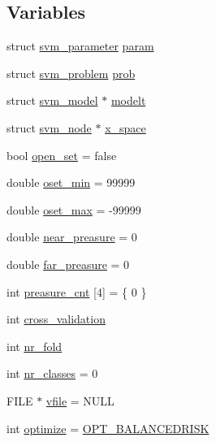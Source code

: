 \subsection*{Variables}
\begin{DoxyCompactItemize}
\item 
struct \hyperlink{structsvm__parameter}{svm\-\_\-parameter} \hyperlink{_2svm-train_8cpp_abef2e39cc4fa6cc6870dddf9afa2cfad}{param}
\item 
struct \hyperlink{structsvm__problem}{svm\-\_\-problem} \hyperlink{_2svm-train_8cpp_a3d3cd08abb1a582bcbb3095eb03ed0d6}{prob}
\item 
struct \hyperlink{structsvm__model}{svm\-\_\-model} $\ast$ \hyperlink{_2svm-train_8cpp_a0b730cfd99e9c8a2ece39a165ebcc5ef}{modelt}
\item 
struct \hyperlink{structsvm__node}{svm\-\_\-node} $\ast$ \hyperlink{_2svm-train_8cpp_aee6e5726660b16e12499d9bfa6eef01f}{x\-\_\-space}
\item 
bool \hyperlink{_2svm-train_8cpp_a17843ee1d8102ef588a3f997e827bc70}{open\-\_\-set} = false
\item 
double \hyperlink{_2svm-train_8cpp_a2bcd8955244b3b5ed1918acc0ce4014e}{oset\-\_\-min} = 99999
\item 
double \hyperlink{_2svm-train_8cpp_a6a83be17519c65392007b1449d5246e9}{oset\-\_\-max} = -\/99999
\item 
double \hyperlink{_2svm-train_8cpp_ab569b65ce2e86831530c897a3ad5c901}{near\-\_\-preasure} = 0
\item 
double \hyperlink{_2svm-train_8cpp_a57ce01656059264c677404c310f3a04e}{far\-\_\-preasure} = 0
\item 
int \hyperlink{_2svm-train_8cpp_aee8f27d5a82f967da296688aee11c230}{preasure\-\_\-cnt} \mbox{[}4\mbox{]} = \{ 0 \}
\item 
int \hyperlink{_2svm-train_8cpp_a3ed295b75b08a20ed2bbed4a67f8d18a}{cross\-\_\-validation}
\item 
int \hyperlink{_2svm-train_8cpp_a8e8ea59d1060e411ced9b25867c66651}{nr\-\_\-fold}
\item 
int \hyperlink{_2svm-train_8cpp_ad88594354ad0cd1b5f3cebf37f8381cf}{nr\-\_\-classes} = 0
\item 
F\-I\-L\-E $\ast$ \hyperlink{_2svm-train_8cpp_a32ca8324fdbaa5886494c3794aabb98e}{vfile} = N\-U\-L\-L
\item 
int \hyperlink{_2svm-train_8cpp_aa33cf9fcdc419d39c5d05fa458bf089a}{optimize} = \hyperlink{_2svm-train_8cpp_a534c2d1c329720ab36237c4d297a2b20}{O\-P\-T\-\_\-\-B\-A\-L\-A\-N\-C\-E\-D\-R\-I\-S\-K}

\end{DoxyCompactItemize}
